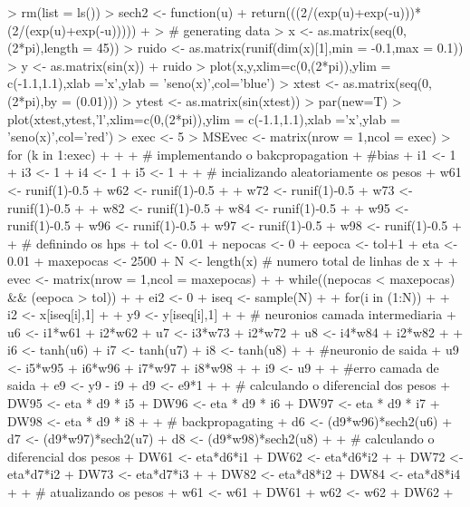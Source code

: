 \documentclass{article}
\begin{document}
\begin{Schunk}
\begin{Sinput}
> rm(list = ls())
> sech2 <- function(u){
+   return(((2/(exp(u)+exp(-u)))*(2/(exp(u)+exp(-u)))))
+ }
> # generating data
> x <- as.matrix(seq(0,(2*pi),length = 45))
> ruido <- as.matrix(runif(dim(x)[1],min = -0.1,max = 0.1))
> y <- as.matrix(sin(x)) + ruido
> plot(x,y,xlim=c(0,(2*pi)),ylim = c(-1.1,1.1),xlab ='x',ylab = 'seno(x)',col='blue')
> xtest <- as.matrix(seq(0,(2*pi),by = (0.01)))
> ytest <- as.matrix(sin(xtest))
> par(new=T)
> plot(xtest,ytest,'l',xlim=c(0,(2*pi)),ylim = c(-1.1,1.1),xlab ='x',ylab = 'seno(x)',col='red')
> exec <- 5
> MSEvec <- matrix(nrow = 1,ncol = exec)
> for (k in 1:exec) {
+     
+   
+   # implementando o bakcpropagation
+   #bias
+   i1 <- 1
+   i3 <- 1
+   i4 <- 1
+   i5 <- 1
+   
+   # incializando aleatoriamente os pesos
+   w61 <- runif(1)-0.5
+   w62 <- runif(1)-0.5
+   
+   w72 <- runif(1)-0.5
+   w73 <- runif(1)-0.5
+   
+   w82 <- runif(1)-0.5
+   w84 <- runif(1)-0.5
+   
+   w95 <- runif(1)-0.5
+   w96 <- runif(1)-0.5
+   w97 <- runif(1)-0.5
+   w98 <- runif(1)-0.5
+   
+   # definindo os hps 
+   tol <- 0.01
+   nepocas <- 0
+   eepoca <- tol+1
+   eta <- 0.01
+   maxepocas <- 2500
+   N <- length(x) # numero total de linhas de x 
+   
+   evec <- matrix(nrow = 1,ncol = maxepocas)
+   
+   while((nepocas < maxepocas) && (eepoca > tol)){
+     
+     ei2 <- 0 
+     iseq <- sample(N)
+   
+     for(i in (1:N)){
+       
+       i2 <- x[iseq[i],1]
+       
+       y9 <- y[iseq[i],1]
+       
+       # neuronios camada intermediaria
+       u6 <- i1*w61 + i2*w62
+       u7 <- i3*w73 + i2*w72
+       u8 <- i4*w84 + i2*w82
+       
+       i6 <- tanh(u6)
+       i7 <- tanh(u7)
+       i8 <- tanh(u8)
+       
+       #neuronio de saida
+       u9 <- i5*w95 + i6*w96 + i7*w97 + i8*w98
+       
+       i9 <- u9
+       
+       #erro camada de saida
+       e9 <- y9 - i9
+       d9 <- e9*1
+       
+       # calculando o diferencial dos pesos
+       DW95 <- eta * d9 * i5
+       DW96 <- eta * d9 * i6
+       DW97 <- eta * d9 * i7
+       DW98 <- eta * d9 * i8
+       
+       # backpropagating
+       d6 <- (d9*w96)*sech2(u6)
+       d7 <- (d9*w97)*sech2(u7)
+       d8 <- (d9*w98)*sech2(u8)
+       
+       # calculando o diferencial dos pesos
+       DW61 <- eta*d6*i1 
+       DW62 <- eta*d6*i2
+       
+       DW72 <- eta*d7*i2
+       DW73 <- eta*d7*i3
+       
+       DW82 <- eta*d8*i2
+       DW84 <- eta*d8*i4
+       
+       # atualizando os pesos 
+       w61 <- w61 + DW61
+       w62 <- w62 + DW62
+       
}}}
\end{Sinput}
\end{Schunk}
\end{document}
